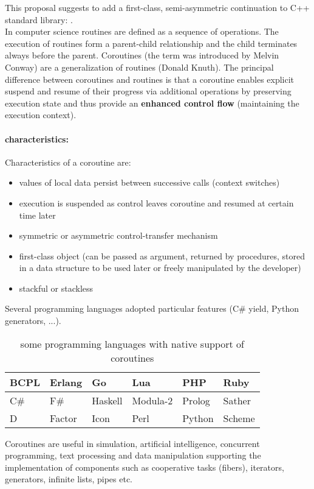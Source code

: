 
This proposal suggests to add a first-class, semi-asymmetric continuation to
C++ standard library: \coro.\\
\newline
In computer science routines are defined as a sequence of operations. The
execution of routines form a parent-child relationship and the child terminates
always before the parent. Coroutines (the term was introduced by Melvin
Conway\cite{Conway1963}) are a generalization of routines (Donald
Knuth\cite{Knuth1997}). The principal difference between coroutines and routines
is that a coroutine enables explicit suspend and resume of their progress via
additional operations by preserving execution state and thus provide an
{\bf enhanced control flow} (maintaining the execution context).\\

\paragraph*{characteristics:}
Characteristics\cite{Moura2009} of a coroutine are:
\begin{itemize}
    \item values of local data persist between successive calls (context
          switches)
    \item execution is suspended as control leaves coroutine and resumed at
          certain time later
    \item symmetric or asymmetric control-transfer mechanism
    \item first-class object (can be passed as argument, returned by procedures,
          stored in a data structure to be used later or freely manipulated by
          the developer)
    \item stackful or stackless
\end{itemize}

Several programming languages adopted particular features (C\# yield, Python
generators, ...).
\begin{table}[h]
    \centering
    \begin{tabular}{ l l l l l l }
        \midrule
        BCPL    &   Erlang  &   Go      &   Lua         &   PHP     &   Ruby \\
        \midrule
        C\#     &   F\#     &   Haskell &   Modula-2    &   Prolog  &   Sather \\
        \midrule
        D       &   Factor  &   Icon    &   Perl        &   Python  &   Scheme \\
        \midrule
    \end{tabular}
    \caption{some programming languages with native support of coroutines}
\end{table}
\newline
Coroutines are useful in simulation, artificial intelligence, concurrent
programming, text processing and data manipulation\cite{Moura2009} supporting
the implementation of components such as cooperative tasks (fibers), iterators,
generators, infinite lists, pipes etc.

